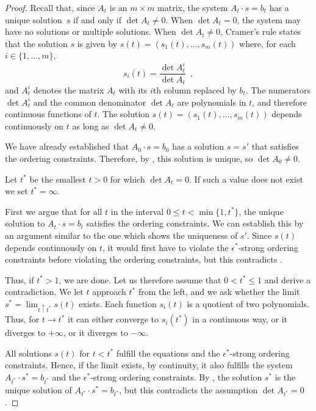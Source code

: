 \documentclass{patmorin}
\begin{document}
\begin{proof}
   Recall that, since $A_t$ is an $m\times m$ matrix, the system $A_t\cdot
   s=b_t$ has a unique solution~$s$ if and only if $\det A_t \neq 0$.
When $\det A_t =0$, the system may have no solutions or
   multiple solutions.  
When $\det A_t\neq 0$, 
   Cramer's rule states that
the solution
   $s$ is given by $s(t)=(s_1(t),\ldots,s_m(t))$ where, for each
   $i\in\{1,\ldots,m\}$,
   \[ 
       s_i(t) = \frac{\det A_t^i}{\det A_t } \enspace ,
   \]
   and $A_t^i$ denotes the matrix $A_t$ with its $i$th column replaced
   by $b_t$. 
The numerators $\det A_t^i$ and the common
 denominator $\det A_t $ are polynomials in $t$, and therefore
 continuous
functions of $t$.
The solution $s(t)=(s_1(t),\ldots,s_m(t))$ depends continuously on $t$
as long as  $\det A_t\ne0 $.

   We have already established that $A_0\cdot s=b_0$ has a solution $s=s'$
   that satisfies the ordering constraints. Therefore, by , this solution
   is unique, so $\det A_0\neq 0$.

Let $t^*$ be the smallest $t>0$
for which 
 $\det A_{t}= 0$. If such a value does not exist we set $t^*=\infty$.

First we argue that for all $t$ in the interval
$0\le t < \min\{1,t^*\}$,
the unique
solution to $A_t\cdot s=b_t$
 satisfies the ordering constraints.
We can establish this by an argument
   similar to the one which shows the uniqueness of $s'$.
Since
 $s(t)$ depends continuously on $t$,
it would first have to violate the  $\epsilon^*$-strong ordering constraints
before violating the ordering constraints, but this contradicts
   .

Thus, if $t^*>1$, we are done.
Let us therefore assume that $0<t^*\le 1$ and derive a contradiction.
We let $t$ approach $t^*$ from the left, and we ask
whether the limit $s^*=\lim_{t\uparrow t^*}
   s(t)$ exists.
Each function $s_i(t)$ is a quotient of two polynomials.
Thus, for $t\to t^*$ it can either converge to $s_i(t^*)$ in a
continuous way, 
or it diverges to $+\infty$,
or it diverges to $-\infty$.

All solutions $s(t)$ for $t<t^*$ fulfill the equations and
the $\epsilon^*$-strong ordering constraints.
Hence, if the limit exists, by continuity, it also fulfills
the system $A_{t^*}\cdot s^*=b_{t^*}$
and the $\epsilon^*$-strong ordering constraints.
 By , the solution $s^*$ is
the unique solution
of $A_{t^*}\cdot s^*=b_{t^*}$, but this contradicts the assumption
$\det A_{t^*}= 0$.


\end{proof}
\end{document}
